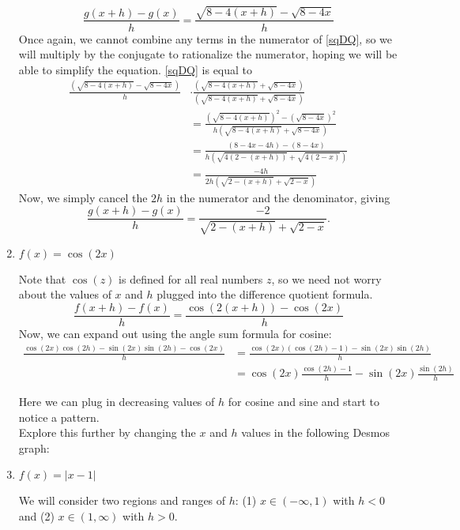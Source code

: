 \documentclass{ximera}
\begin{document}
\begin{example}
\begin{enumerate}
\begin{explanation}
  \begin{equation}\label{sqDQ}
   \frac{g(x+h) - g(x)}{h} = \frac{\sqrt{8-4(x+h)} - \sqrt{8-4x}}{h}
  \end{equation}
  Once again, we cannot combine any terms in the numerator of \eqref{sqDQ}, so we will multiply by the conjugate to rationalize the numerator, hoping we will be able to simplify the equation. \eqref{sqDQ} is equal to
  \begin{align*}
 \frac{(\sqrt{8-4(x+h)} - \sqrt{8-4x})}{h} &\cdot \frac{(\sqrt{8-4(x+h)} + \sqrt{8-4x})}{(\sqrt{8-4(x+h)} + \sqrt{8-4x})} \\
  &=  \frac{(\sqrt{8-4(x+h)})^2 - (\sqrt{8-4x})^2}{h(\sqrt{8-4(x+h)} + \sqrt{8-4x})} \\
  &= \frac{(8-4x-4h) - (8-4x)}{h(\sqrt{4(2-(x+h))} + \sqrt{4(2-x)})}\\
  &= \frac{-4h}{2h(\sqrt{2-(x+h)} + \sqrt{2-x})}
  \end{align*}
  Now, we simply cancel the $2h$ in the numerator and the denominator, giving
  $$ \frac{g(x+h) - g(x)}{h} = \frac{-2}{\sqrt{2-(x+h)} + \sqrt{2-x}}.$$
  \end{explanation}
  \item $f(x) = \cos(2x)$
 \\
 \begin{explanation}
 Note that $\cos(z)$ is defined for all real numbers $z$, so we need not worry about the values of $x$ and $h$ plugged into the difference quotient formula.
 \begin{equation*}\label{cosDQ}
 \frac{f(x+h) - f(x)}{h} = \frac{\cos(2(x+h)) - \cos(2x)}{h}
 \end{equation*}
 Now, we can expand out using the angle sum formula for cosine:
 \begin{align*}
 \frac{\cos(2x)\cos(2h)-\sin(2x)\sin(2h) - \cos(2x)}{h} 
 &= \frac{\cos(2x)(\cos(2h)-1)- \sin(2x)\sin(2h)}{h} \\
 &=  \cos(2x)\frac{\cos(2h)-1}{h}- \sin(2x)\frac{\sin(2h)}{h}
 \end{align*}
 
Here we can plug in decreasing values of $h$ for cosine and sine and start to notice a pattern.\\
Explore this further by changing the $x$ and $h$ values in the following Desmos graph:
 \end{explanation}
  \item $f(x) = |x-1|$ %
  \\
   \begin{explanation}
   We will consider two regions and ranges of $h$: (1) $x \in (-\infty,1)$ with $h<0$ and (2) $x\in(1, \infty)$ with $h>0$. 
   

\end{explanation}
\end{enumerate}
\end{example}
\end{document}

